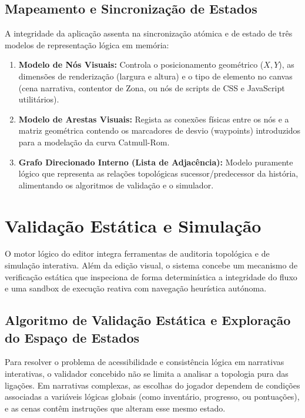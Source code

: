 \subsection{Mapeamento e Sincronização de Estados}
\label{subsec:modelacao-dados-reactflow}
A integridade da aplicação assenta na sincronização atómica e de estado de três modelos de representação lógica em memória:
\begin{enumerate}
    \item \textbf{Modelo de Nós Visuais:} Controla o posicionamento geométrico ($X, Y$), as dimensões de renderização (largura e altura) e o tipo de elemento no canvas (cena narrativa, contentor de Zona, ou nós de scripts de CSS e JavaScript utilitários).
    
    \item \textbf{Modelo de Arestas Visuais:} Regista as conexões físicas entre os nós e a matriz geométrica contendo os marcadores de desvio (waypoints) introduzidos para a modelação da curva Catmull-Rom.
    
    \item \textbf{Grafo Direcionado Interno (Lista de Adjacência):} Modelo puramente lógico que representa as relações topológicas sucessor/predecessor da história, alimentando os algoritmos de validação e o simulador.
\end{enumerate}

\section{Validação Estática e Simulação}
\label{sec:validacao-estatica-simulacao}

O motor lógico do editor integra ferramentas de auditoria topológica e de simulação interativa. Além da edição visual, o sistema concebe um mecanismo de verificação estática que inspeciona de forma determinística a integridade do fluxo e uma sandbox de execução reativa com navegação heurística autónoma.

\subsection{Algoritmo de Validação Estática e Exploração do Espaço de Estados}
\label{subsec:algoritmo-bfs-validacao}

Para resolver o problema de acessibilidade e consistência lógica em narrativas interativas, o validador concebido não se limita a analisar a topologia pura das ligações. Em narrativas complexas, as escolhas do jogador dependem de condições associadas a variáveis lógicas globais (como inventário, progresso, ou pontuações), e as cenas contêm instruções que alteram esse mesmo estado.


